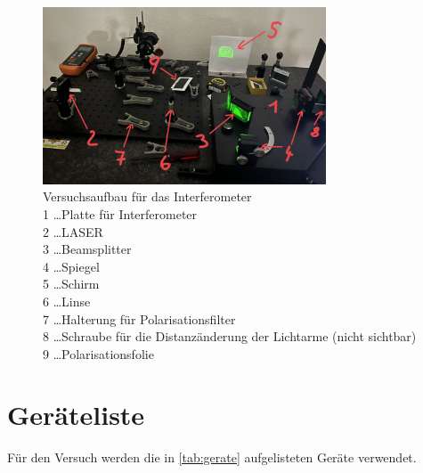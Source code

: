 \documentclass[12pt,english,ngerman]{scrartcl}
\begin{document}
\begin{figure}[H]
	\begin{center}
		\includegraphics[width =0.75\textwidth]{./figures/aufbau_interferometer.jpg}
	\end{center}
	\caption[Versuchsaufbau für das Interferometer] { Versuchsaufbau für das Interferometer                                   \\
		1 \dots Platte für Interferometer                                       \\
		2 \dots LASER                                                           \\
		3 \dots Beamsplitter                                                    \\
		4 \dots Spiegel                                                         \\
		5 \dots Schirm                                                          \\
		6 \dots Linse                                                           \\
		7 \dots Halterung für Polarisationsfilter                               \\
		8 \dots Schraube für die Distanzänderung der Lichtarme (nicht sichtbar) \\
		9 \dots Polarisationsfolie                                              \\
	}\label{fig:aufbau_interferometer}
\end{figure}

\section{Geräteliste}\label{sec:geraeteliste}

Für den Versuch werden die in \autoref{tab:gerate} aufgelisteten Geräte
verwendet.
\end{document}
